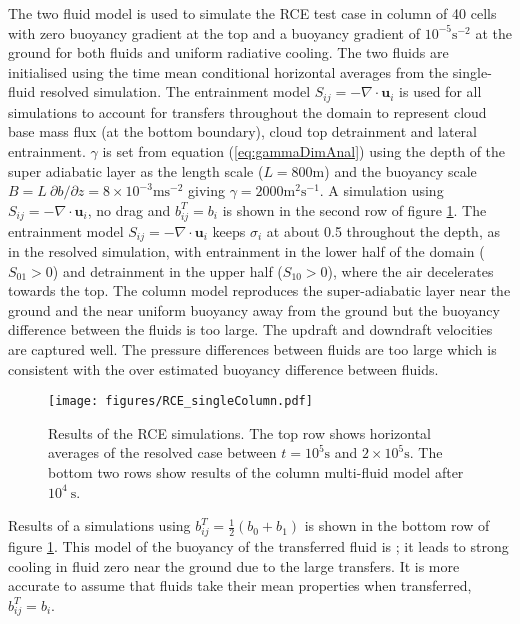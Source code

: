 \documentclass[draft]{agujournal2019}
\begin{document}
The two fluid model is used to simulate the RCE test case in 
column of 40 cells with zero buoyancy gradient at the top and a buoyancy
gradient of $10^{-5}\text{s}^{-2}$ at the ground for both fluids
and uniform radiative cooling. The two fluids are initialised using
the time mean conditional horizontal averages from the single-fluid
resolved simulation. The entrainment model $S_{ij}=-\nabla\cdot\mathbf{u}_{i}$
is used for all simulations to account for transfers throughout the
domain to represent cloud base mass flux (at the bottom boundary),
cloud top detrainment and lateral entrainment. $\gamma$ is set from
equation (\ref{eq:gammaDimAnal}) using the depth of the super adiabatic
layer as the length scale ($L=800\text{m}$) and the buoyancy scale
$B=L\ \partial b/\partial z=8\times10^{-3}\text{m}\text{s}^{-2}$
giving $\gamma=2000\text{m}^{2}\text{s}^{-1}$. A simulation using
$S_{ij}=-\nabla\cdot\mathbf{u}_{i}$, no drag and $b_{ij}^{T}=b_{i}$
is shown in the second row of figure \ref{fig:RCE_singleColumn}.
The entrainment model $S_{ij}=-\nabla\cdot\mathbf{u}_{i}$ keeps $\sigma_{i}$
at about 0.5 throughout the depth, as in the resolved simulation,
with entrainment in the lower half of the domain ($S_{01}>0$) and
detrainment in the upper half ($S_{10}>0$), where the air decelerates
towards the top. The  column model reproduces the super-adiabatic
layer near the ground and the near uniform buoyancy away from the
ground but the buoyancy difference between the fluids is too large.
The updraft and downdraft velocities are captured well. The pressure
differences between fluids are too large which is consistent with
the over estimated buoyancy difference between fluids. 

\begin{figure}
\noindent
\texttt{[image: figures/RCE\_singleColumn.pdf]}
\caption{\label{fig:RCE_singleColumn}
Results of the RCE simulations. The top row shows horizontal averages
of the resolved case between $t=10^{5}\text{s}$ and $2\times10^{5}\text{s}$. The bottom two rows show results of the  column multi-fluid model after $10^{4}\ \text{s}$. }
\end{figure}

Results of a simulations using $b_{ij}^{T}=\frac{1}{2}(b_{0}+b_{1})$
is shown in the bottom row of figure \ref{fig:RCE_singleColumn}.
This model of the buoyancy of the transferred fluid is ; it leads
to strong cooling in fluid zero near the ground due to the large transfers.
It is more accurate to assume that fluids take their mean properties
when transferred, $b_{ij}^{T}=b_{i}$. 
\end{document}
